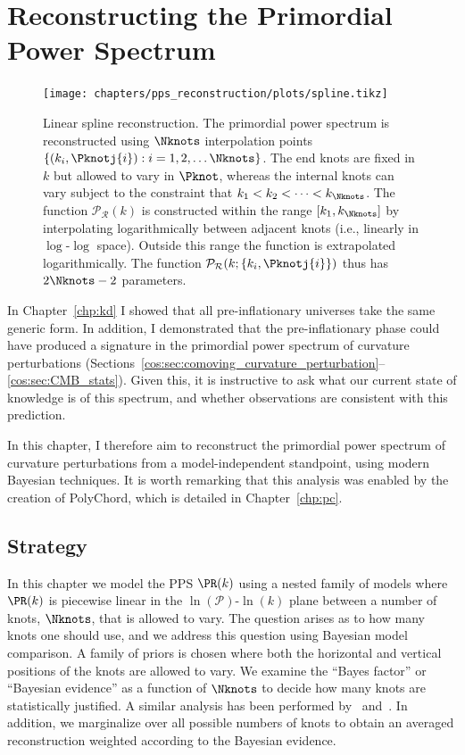 \chapter[PPS reconstruction]{Reconstructing the Primordial Power Spectrum}
\label{chp:rec}

\begin{figure}[tp]
    \texttt{[image: chapters/pps\_reconstruction/plots/spline.tikz]}
  \caption{%
    Linear spline reconstruction. The primordial power spectrum is reconstructed using \(\Nknots\) interpolation points \({\{(k_i,\Pknotj{i}):i=1,2,\ldots {\Nknots}\}}\). The end knots are fixed in \(k\) but allowed to vary in \({\Pknot}\), whereas the internal knots can vary subject to the constraint that \({k_1<k_2<\cdots<k_{\Nknots}}\).  The function \(\mathcal{P}_\mathcal{R}(k)\) is constructed within the range \([k_1,k_{\Nknots}]\) by interpolating logarithmically between adjacent knots (i.e., linearly in \(\log\)-\(\log\) space). Outside this range the function is extrapolated logarithmically.  The function \(\mathcal{P}_\mathcal{R}(k;\{k_i,\Pknotj{i}\})\) thus has \(2\Nknots-2\) parameters.  }\label{fig:linear_spline_reconstruction}
\end{figure}

In Chapter~\ref{chp:kd} I showed that all pre-inflationary universes take the same generic form. In addition, I demonstrated that the pre-inflationary phase could have produced a signature in the primordial power spectrum of curvature perturbations (Sections~\ref{cos:sec:comoving_curvature_perturbation}--\ref{cos:sec:CMB_stats}). Given this, it is instructive to ask what our current state of knowledge is of this spectrum, and whether observations are consistent with this prediction.

In this chapter, I therefore aim to reconstruct the primordial power spectrum of curvature perturbations from a model-independent standpoint, using modern Bayesian techniques. It is worth remarking that this analysis was enabled by the creation of PolyChord, which is detailed in Chapter~\ref{chp:pc}.

\section{Strategy}
In this chapter we model the PPS \(\PR(k)\) using a nested family of models where \(\PR(k)\) is piecewise linear in the \(\ln (\mathcal{P})\)-\(\ln (k)\) plane between a number of knots, \(\Nknots\), that is allowed to vary. The question arises as to how many knots one should use, and we address this question using Bayesian model comparison.  A family of priors is chosen where both the horizontal and vertical positions of the knots are allowed to vary. We examine the ``Bayes factor'' or ``Bayesian evidence'' as a function of \(\Nknots\) to decide how many knots are statistically justified.  A similar analysis has been performed by~\cite{vazquez_knots} and~\cite{knottedsky1}.  In addition, we marginalize over all possible numbers of knots to obtain an averaged reconstruction weighted according to the Bayesian evidence.

